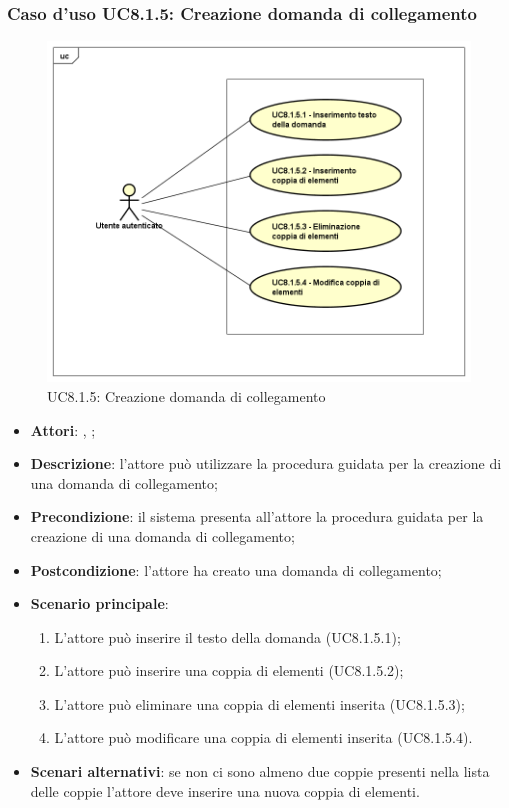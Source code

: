 \subsubsection{Caso d'uso UC8.1.5: Creazione domanda di collegamento}
\label{UC8.1.5}
\begin{figure}[ht]
	\centering
\includegraphics[scale=0.5,keepaspectratio]{UML/UC8_1_5.png}
	\caption{UC8.1.5: Creazione domanda di collegamento}
\end{figure}
\FloatBarrier
\begin{itemize}
	\item \textbf{Attori}: \uau, \uaupro;
	\item \textbf{Descrizione}: l'attore può utilizzare la procedura guidata per la creazione di una domanda di collegamento; 
	\item \textbf{Precondizione}: il sistema presenta all'attore la procedura guidata per la creazione di una domanda di collegamento;
	\item \textbf{Postcondizione}: l'attore ha creato una domanda di collegamento;
	\item \textbf{Scenario principale}: 
		\begin{enumerate}
			\item L'attore può inserire il testo della domanda (UC8.1.5.1);
			\item L'attore può inserire una coppia di elementi (UC8.1.5.2);
			\item L'attore può eliminare una coppia di elementi inserita (UC8.1.5.3);
			\item L'attore può modificare una coppia di elementi inserita (UC8.1.5.4).
		\end{enumerate}
	\item \textbf{Scenari alternativi}: se non ci sono almeno due coppie presenti nella lista delle coppie l'attore deve inserire una nuova coppia di elementi.
\end{itemize}


